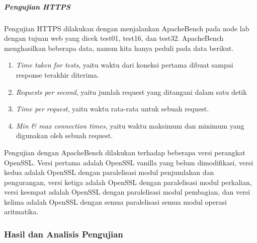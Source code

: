       \subparagraph{Pengujian HTTPS}
      Pengujian HTTPS dilakukan dengan menjalankan ApacheBench pada node lab dengan tujuan web yang dicek test01, test16, dan test32. ApacheBench menghasilkan beberapa data, namun kita hanya peduli pada data berikut.
      \begin{enumerate}[label=\roman*.]
        \item \textit{Time taken for tests}, yaitu waktu dari koneksi pertama dibuat sampai response terakhir diterima.
        \item \textit{Requests per second}, yaitu jumlah request yang ditangani dalam satu detik
        \item \textit{Time per request}, yaitu waktu rata-rata untuk sebuah request.
        \item \textit{Min \& max connection times}, yaitu waktu maksimum dan minimum yang digunakan oleh sebuah request.
      \end{enumerate}

      Pengujian dengan ApacheBench dilakukan terhadap beberapa versi perangkat OpenSSL. Versi pertama adalah OpenSSL vanilla yang belum dimodifikasi, versi kedua adalah OpenSSL dengan paralelisasi modul penjumlahan dan pengurangan, versi ketiga adalah OpenSSL dengan paralelisasi modul perkalian, versi keempat adalah OpenSSL dengan paralelisasi modul pembagian, dan versi kelima adalah OpenSSL dengan semua paralelisasi semua modul operasi aritmatika.

    \subsubsection{Hasil dan Analisis Pengujian}

